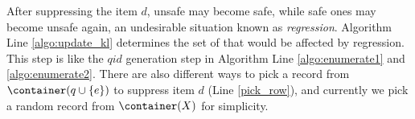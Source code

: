 After suppressing the item $d$, unsafe \qids may become safe, while safe ones
may become unsafe again, an undesirable situation known as {\em regression}.
Algorithm \SanitizeBuffer Line \ref{algo:update_kl} determines the set of
\qids that would be affected by regression. This step is like the $qid$
generation step in Algorithm \PartialSuppressor Line \ref{algo:enumerate1}
and \ref{algo:enumerate2}. There are also different ways to pick a
record from $\container(q\cup \{e\})$ to suppress item $d$ (Line
\ref{pick_row}), and currently we pick a random record from $\container(X)$
for simplicity.

\begin{table*}[th]
\caption{A Running Example}
\centering
\end{table*}
